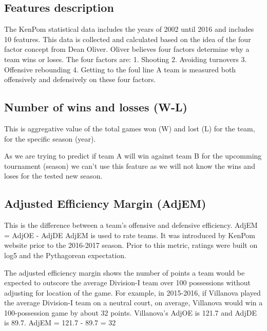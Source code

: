 \documentclass[
10pt, %
a4paper, %
oneside, %
headinclude,footinclude, %
BCOR5mm, %
]{scrartcl}
\begin{document}
\subsection{Features description}
The KenPom statistical data includes the years of 2002 until 2016 and includes 10 features. This data is collected and calculated based on the idea of the four factor concept from Dean Oliver.
Oliver believes four factors determine why a team wins or loses. The four factors are:
1. Shooting
2. Avoiding turnovers
3. Offensive rebounding
4. Getting to the foul line
A team is measured both offensively and defensively on these four factors.
\begin{description}
\subsection{Number of wins and losses (W-L)}
\begin{description}
This is aggregative value of the total games won (W) and lost (L) for the team, for the specific season (year).

As we are trying to predict if team A will win against team B for the upcomming tournament (season) we can't use this feature as we will not know the wins and loses for the tested new season.
\end{description}
\subsection{Adjusted Efficiency Margin (AdjEM)}
\begin{description}
This is the difference between a team’s offensive and defensive efficiency.
AdjEM = AdjOE - AdjDE
AdjEM is used to rate teams. It was introduced by KenPom website prior to the 2016-2017 season. Prior to this metric, ratings were built on log5 and the Pythagorean expectation.

The adjusted efficiency margin shows the number of points a team would be expected to outscore the average Division-I team over 100 possessions without adjusting for location of the game.
For example, in 2015-2016, if Villanova played the average Division-I team on a neutral court, on average, Villanova would win a 100-possession game by about 32 points.
Villanova's AdjOE is 121.7 and AdjDE is 89.7.
AdjEM = 121.7 - 89.7 = 32


\end{description}
\end{description}
\end{document}
